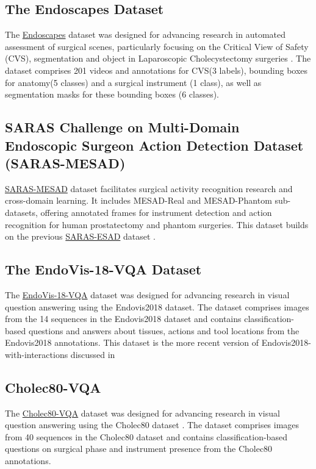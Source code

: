 \subsection{The Endoscapes Dataset}
The \href{https://github.com/CAMMA-public/Endoscapes}{Endoscapes} dataset was designed for advancing research in automated assessment of surgical scenes, particularly focusing on the Critical View of Safety (CVS), segmentation and object in Laparoscopic Cholecystectomy surgeries \citep{murali2023endoscapes}. 
The dataset comprises 201 videos and annotations for CVS(3 labels), bounding boxes for anatomy(5 classes) and a surgical instrument (1 class), as well as segmentation masks for these bounding boxes (6 classes).



\subsection{SARAS Challenge on Multi-Domain Endoscopic Surgeon Action Detection Dataset (SARAS-MESAD)}
\href{https://saras-mesad.grand-challenge.org/Home/}{SARAS-MESAD} dataset \citep{saras_mesad} facilitates surgical activity recognition research and cross-domain learning. It includes MESAD-Real and MESAD-Phantom sub-datasets, offering annotated frames for instrument detection and action recognition for human prostatectomy and phantom surgeries. This dataset builds on the previous \href{https://saras-esad.grand-challenge.org/}{SARAS-ESAD} dataset \citep{bawa2021saras}.



\subsection{The EndoVis-18-VQA Dataset} \label{sec:endovis_2018_vqa_dataset}
The \href{https://github.com/lalithjets/SurgicalGPT}{EndoVis-18-VQA} dataset  \citep{seenivasan2022surgical} was designed for advancing research in visual question answering using the Endovis2018 dataset. 
The dataset comprises images from the 14 sequences in the Endovis2018 dataset and contains classification-based questions and answers about tissues, actions and tool locations from the Endovis2018 annotations. This dataset is the more recent version of Endovis2018-with-interactions discussed in 


\subsection{Cholec80-VQA}
The \href{https://github.com/lalithjets/SurgicalGPT}{Cholec80-VQA} dataset was designed for advancing research in visual question answering using the Cholec80 dataset \citep{seenivasan2022surgical}. 
The dataset comprises images from 40 sequences in the Cholec80 dataset and contains classification-based questions on surgical phase and instrument presence from the Cholec80 annotations.

